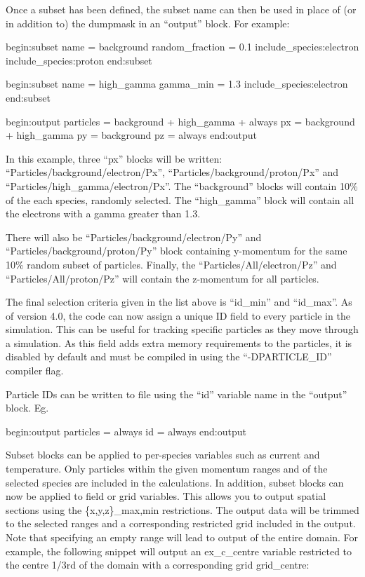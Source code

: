 Once a subset has been defined, the subset name can then be used in place of
(or in addition to) the dumpmask in an ``output'' block. For example:
{\samepage
\begin{boxverbatim}
begin:subset
   name = background
   random_fraction = 0.1
   include_species:electron
   include_species:proton
end:subset

begin:subset
   name = high_gamma
   gamma_min = 1.3
   include_species:electron
end:subset

begin:output
   particles = background + high_gamma + always
   px = background + high_gamma
   py = background
   pz = always
end:output
\end{boxverbatim}
}

In this example, three ``px'' blocks will be written:
``Particles/background/electron/Px'', ``Particles/background/proton/Px''
and ``Particles/high\_gamma/electron/Px''.
The ``background'' blocks will contain 10\% of the each species, randomly
selected.
The ``high\_gamma'' block will contain all the electrons with a gamma
greater than 1.3.

There will also be ``Particles/background/electron/Py'' and
``Particles/background/proton/Py'' block containing y-momentum for the same
10\% random subset of particles.
Finally, the ``Particles/All/electron/Pz'' and ``Particles/All/proton/Pz'' will
contain the z-momentum for all particles.

The final selection criteria given in the list above is ``id\_min'' and
``id\_max''. As of {\EPOCH} version 4.0, the code can now assign a unique
ID field to every particle in the simulation. This can be useful for
tracking specific particles as they move through a simulation. As this
field adds extra memory requirements to the particles, it is disabled by
default and must be compiled in using the ``-DPARTICLE\_ID'' compiler flag.

Particle IDs can be written to file using the ``id'' variable name in
the ``output'' block.  Eg.
\begin{boxverbatim}
begin:output
   particles = always
   id = always
end:output
\end{boxverbatim}

Subset blocks can be applied to per-species variables such as current and
temperature. Only particles within the given momentum ranges and of the selected
species are included in the calculations. In addition, subset blocks can now
be applied to field or grid variables. This allows
you to output spatial sections using the {\emphtext \{x,y,z\}\_max,min}
restrictions.
The output data will be trimmed to the selected ranges and a corresponding
restricted grid included in the output. Note that specifying an empty range
will lead to output of the entire domain. For example, the following snippet
will output an ex\_c\_centre variable restricted to the centre 1/3rd of the
domain with a corresponding grid grid\_centre:

